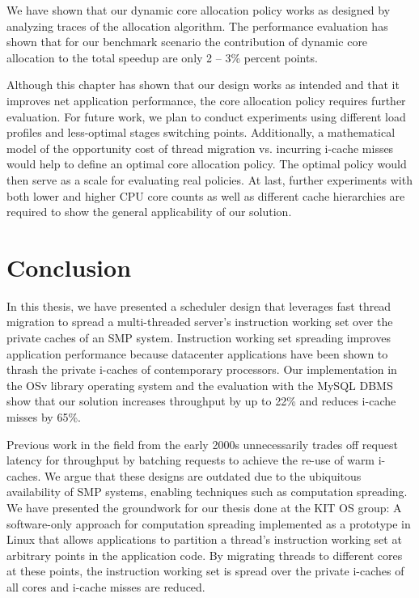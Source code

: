\documentclass[12pt,a4paper]{book}
\begin{document}
We have shown that our dynamic core allocation policy works as designed by analyzing traces of the allocation algorithm.
The performance evaluation has shown that for our benchmark scenario the contribution of dynamic core allocation to the total speedup are only 2 -- 3\% percent points.

Although this chapter has shown that our design works as intended and that it improves net application performance, the core allocation policy requires further evaluation.
For future work, we plan to conduct experiments using different load profiles and less-optimal stages switching points.
Additionally, a mathematical model of the opportunity cost of thread migration vs. incurring i-cache misses would help to define an optimal core allocation policy.
The optimal policy would then serve as a scale for evaluating real policies.
At last, further experiments with both lower and higher CPU core counts as well as different cache hierarchies are required to show the general applicability of our solution.

\chapter{Conclusion}\label{ch:concl}

In this thesis, we have presented a scheduler design that leverages fast thread migration to spread a multi-threaded server's instruction working set over the private caches of an SMP system.
Instruction working set spreading improves application performance because datacenter applications have been shown to thrash the private i-caches of contemporary processors.
Our implementation in the OSv library operating system and the evaluation with the MySQL DBMS show that our solution increases throughput by up to 22\% and reduces i-cache misses by 65\%.

Previous work in the field from the early 2000s unnecessarily trades off request latency for throughput by batching requests to achieve the re-use of warm i-caches.
We argue that these designs are outdated due to the ubiquitous availability of SMP systems, enabling techniques such as computation spreading.
We have presented the groundwork for our thesis done at the KIT OS group:
A software-only approach for computation spreading implemented as a prototype in Linux that allows applications to partition a thread's instruction working set at arbitrary points in the application code.
By migrating threads to different cores at these points, the instruction working set is spread over the private i-caches of all cores and i-cache misses are reduced.
\end{document}
